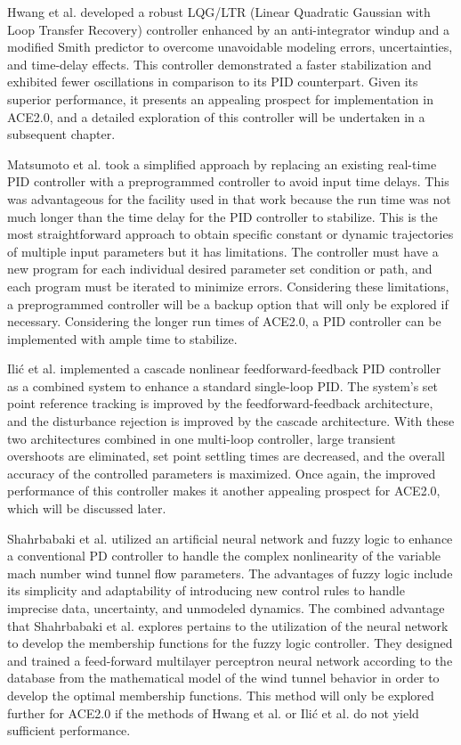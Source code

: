 Hwang et al. \cite{hwang} developed a robust LQG/LTR (Linear Quadratic Gaussian with Loop Transfer Recovery) controller enhanced by an anti-integrator windup and a modified Smith predictor to overcome unavoidable modeling errors, uncertainties, and time-delay effects. This controller demonstrated a faster stabilization and exhibited fewer oscillations in comparison to its PID counterpart. Given its superior performance, it presents an appealing prospect for implementation in ACE2.0, and a detailed exploration of this controller will be undertaken in a subsequent chapter.

Matsumoto et al. \cite{matsumoto} took a simplified approach by replacing an existing real-time PID controller with a preprogrammed controller to avoid input time delays. This was advantageous for the facility used in that work because the run time was not much longer than the time delay for the PID controller to stabilize. This is the most straightforward approach to obtain specific constant or dynamic trajectories of multiple input parameters but it has limitations. The controller must have a new program for each individual desired parameter set condition or path, and each program must be iterated to minimize errors. Considering these limitations, a preprogrammed controller will be a backup option that will only be explored if necessary. Considering the longer run times of ACE2.0, a PID controller can be implemented with ample time to stabilize.

Ili\'c et al. \cite{ilic-2} implemented a cascade nonlinear feedforward-feedback PID controller as a combined system to enhance a standard single-loop PID. The system's set point reference tracking is improved by the feedforward-feedback architecture, and the disturbance rejection is improved by the cascade architecture. With these two architectures combined in one multi-loop controller, large transient overshoots are eliminated, set point settling times are decreased, and the overall accuracy of the controlled parameters is maximized. Once again, the improved performance of this controller makes it another appealing prospect for ACE2.0, which will be discussed later.

Shahrbabaki et al. \cite{shahrbabaki-1} utilized an artificial neural network and fuzzy logic to enhance a conventional PD controller to handle the complex nonlinearity of the variable mach number wind tunnel flow parameters. The advantages of fuzzy logic include its simplicity and adaptability of introducing new control rules to handle imprecise data, uncertainty, and unmodeled dynamics. The combined advantage that Shahrbabaki et al. explores pertains to the utilization of the neural network to develop the membership functions for the fuzzy logic controller. They designed and trained a feed-forward multilayer perceptron neural network according to the database from the mathematical model of the wind tunnel behavior in order to develop the optimal membership functions. This method will only be explored further for ACE2.0 if the methods of Hwang et al. or Ili\'c et al. do not yield sufficient performance.


